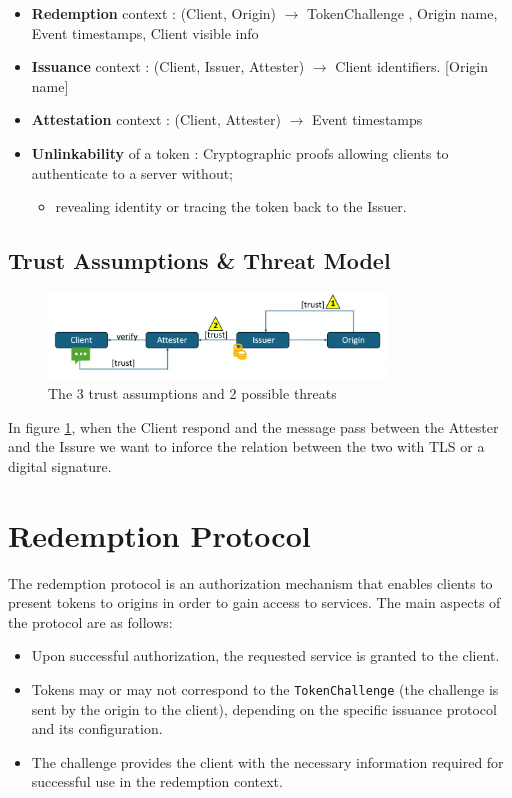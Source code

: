 \begin{itemize}
    \item \textbf{Redemption} context : (Client, Origin) $\rightarrow$ TokenChallenge , Origin name, Event timestamps, Client visible info
    \item \textbf{Issuance} context : (Client, Issuer, Attester) $\rightarrow$ Client identifiers. [Origin name]
    \item \textbf{Attestation} context : (Client, Attester) $\rightarrow$ Event timestamps
    \item\textbf{ Unlinkability} of a token : Cryptographic proofs allowing clients to authenticate to a server without;
    \begin{itemize}
        \item revealing identity or tracing the token back to the Issuer.
    \end{itemize}
\end{itemize}

\subsection{Trust Assumptions \& Threat Model}
\begin{figure}[H]
    \centering
    \includegraphics[width=0.8\textwidth]{img/trust assumptions.png}
    \caption{The 3 trust assumptions and 2 possible threats}
    \label{fig:trust assumptions}
\end{figure}

In figure \ref{fig:trust assumptions}, when the Client respond and the message pass between the Attester and the Issure we want to inforce the relation between the two with TLS or a digital signature. 


\section{Redemption Protocol}

The redemption protocol is an authorization mechanism that enables clients to present tokens to origins in order to gain access to services. The main aspects of the protocol are as follows:

\begin{itemize}
    \item Upon successful authorization, the requested service is granted to the client.
    \item Tokens may or may not correspond to the \texttt{TokenChallenge} (the challenge is sent by the origin to the client), depending on the specific issuance protocol and its configuration.
    \item The challenge provides the client with the necessary information required for successful use in the redemption context.
\end{itemize}


